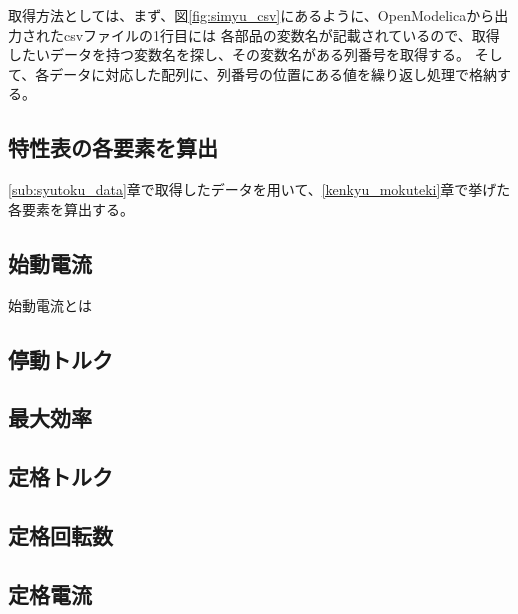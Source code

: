取得方法としては、まず、図\ref{fig:simyu_csv}にあるように、OpenModelicaから出力されたcsvファイルの1行目には
各部品の変数名が記載されているので、取得したいデータを持つ変数名を探し、その変数名がある列番号を取得する。
そして、各データに対応した配列に、列番号の位置にある値を繰り返し処理で格納する。

\subsection{特性表の各要素を算出}\label{sub:keisan}
\ref{sub:syutoku_data}章で取得したデータを用いて、\ref{kenkyu_mokuteki}章で挙げた各要素を算出する。



\subsection{始動電流}\label{sub:sidouden}
始動電流とは
　
\subsection{停動トルク}\label{sub:teidoutoruku}


\subsection{最大効率}\label{sub:saidaikouritu}


\subsection{定格トルク}\label{sub:teikakutoruku}


\subsection{定格回転数}\label{sub:teikakukaiten}


\subsection{定格電流}\label{sub:teikakuden}



